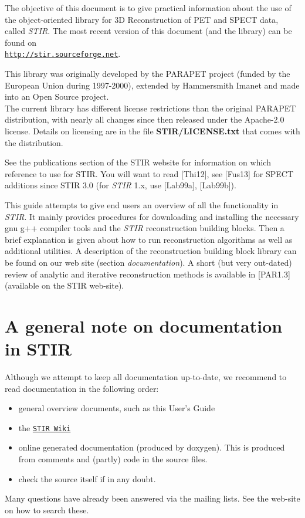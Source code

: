 \documentclass{article}
\def\url#1#2{\mbox{\href{#1}{\tt #2}}}
\begin{document}
The objective of this document is to give practical information 
about the use of the object-oriented library for 3D Reconstruction 
of PET and SPECT data, called \textit{STIR}. The most recent version of this 
document (and the library) can be found on \\
\url{http://stir.sourceforge.net}{http://stir.sourceforge.net}.


This library was originally developed by the PARAPET 
project (funded by the European Union during 1997-2000), extended by Hammersmith 
Imanet and made into an Open Source project. \\
The current library has different license restrictions than the 
original PARAPET distribution, with nearly all changes since then released under the Apache-2.0 license.
Details on licensing are in the file \textbf{STIR/LICENSE.txt} 
that comes with the distribution. 

See the publications section of the STIR website for information on which reference
to use for STIR. You will want to read {[}Thi12], see {[}Fus13] for SPECT additions
since STIR 3.0 (for \textit{STIR} 1.x, use [Lab99a], [Lab99b]).



This guide attempts to give end users an overview of all the functionality
in \textit{STIR}. It mainly provides 
procedures for downloading and installing the necessary gnu g++ 
compiler tools and the \textit{STIR} reconstruction building blocks. 
Then a brief explanation is given about how to run reconstruction 
algorithms as well as additional utilities. A description of 
the reconstruction building block library can be found on our 
web site (section \textit{documentation}). A short (but very out-dated) review of analytic 
and iterative reconstruction methods is available in [PAR1.3] 
(available on the STIR web-site).

\section{
A general note on documentation in STIR}

Although we attempt to keep all documentation up-to-date, we 
recommend to read documentation in the following order:
\begin{itemize}
\item general overview documents, such as this User's Guide
\item the \url{http://stir.sourceforge.net/wiki}{STIR Wiki}
\item 
online generated documentation (produced by doxygen). This is 
produced from comments and (partly) code in the source files.
\item check the source itself if in any doubt.
\end{itemize}
Many questions have already been answered via the mailing lists. See the
web-site on how to search these.
\end{document}

